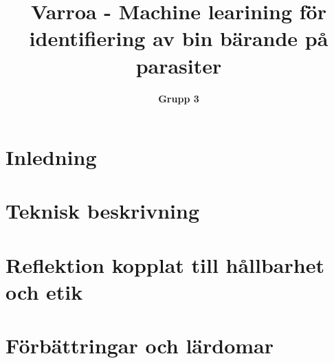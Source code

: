 \documentclass[a4paper]{article}
\begin{document}
\title{\textbf{Varroa - Machine learining för identifiering av bin bärande på parasiter}}	
\author{\textbf{Grupp 3}}				
\maketitle							%

\newpage
\tableofcontents 		%

\newpage
{}				%
\setcounter{page}{1}					%

\section{Inledning}
 \label{sec:inledning}

\section{Teknisk beskrivning}
\label{sec:teknisk}

\section{Reflektion kopplat till hållbarhet och etik}
\label{sec:reflektion}

\section{Förbättringar och lärdomar}
\label{sec:FnL}


\newpage
\raggedright
	
\end{document}
